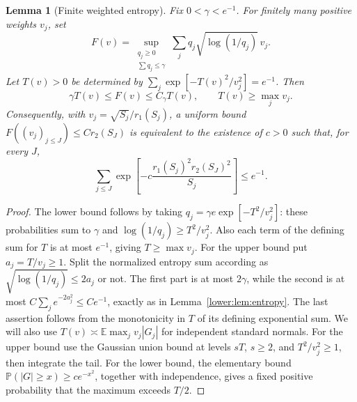 \documentclass[11pt]{article}
\newtheorem{lemma}[theorem]{Lemma}
\newcommand{\E}{\mathbb E}
\newcommand{\PP}{\mathbb P}
\numberwithin{equation}{section}
\begin{document}
\begin{lemma}[Finite weighted entropy]\label{pair:lem:finite-entropy}
Fix \(0<\gamma<e^{-1}\).  For finitely many positive weights \(v_j\), set
\[
 F(v)=\sup_{\substack{q_j\ge0\\\sum q_j\le\gamma}}
     \sum_jq_j\sqrt{\log(1/q_j)}\,v_j.
\]
Let \(T(v)>0\) be determined by
\(\sum_j\exp[-T(v)^2/v_j^2]=e^{-1}\).  Then
\[
 \gamma T(v)\le F(v)\le C_\gamma T(v),\qquad
 T(v)\ge\max_jv_j.
 \tag{P2}\label{pair:eq:entropy-comparison}
\]
Consequently, with \(v_j=\sqrt{S_j}/r_1(S_j)\), a uniform bound
\(F((v_j)_{j\le J})\le C r_2(S_J)\) is equivalent to the existence
of \(c>0\) such that, for every \(J\),
\[
 \sum_{j\le J}
 \exp\left[-c\frac{r_1(S_j)^2r_2(S_J)^2}{S_j}\right]\le e^{-1}.
 \tag{P3}\label{pair:eq:prefix12}
\]
\end{lemma}
\begin{proof}
The lower bound follows by taking
\(q_j=\gamma e\exp[-T^2/v_j^2]\): these probabilities sum to
\(\gamma\) and \(\log(1/q_j)\ge T^2/v_j^2\).  Also each term of
the defining sum for \(T\) is at most \(e^{-1}\), giving
\(T\ge\max v_j\).  For the upper bound put \(a_j=T/v_j\ge1\).
Split the normalized entropy sum according as
\(\sqrt{\log(1/q_j)}\le2a_j\) or not.  The first part is at most
\(2\gamma\), while the second is at most
\(C\sum_j e^{-2a_j^2}\le C e^{-1}\), exactly as in
Lemma~\ref{lower:lem:entropy}.  The last assertion follows from the
monotonicity in \(T\) of its defining exponential sum.  We will also use
\(T(v)\asymp\E\max_jv_j|G_j|\) for independent standard normals.
For the upper bound use the Gaussian union bound at levels \(sT\),
\(s\ge2\), and \(T^2/v_j^2\ge1\), then integrate the tail.
For the lower bound, the elementary bound
\(\PP(|G|\ge x)\ge c e^{-x^2}\), together with independence,
gives a fixed positive probability that the maximum exceeds \(T/2\).
\end{proof}
\end{document}
